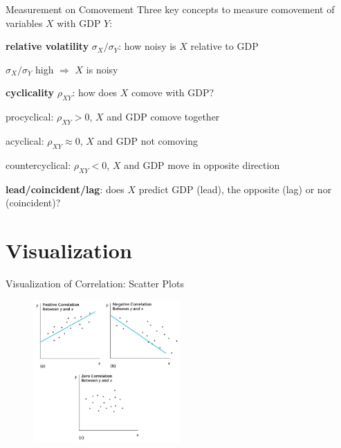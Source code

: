 \documentclass[11pt,aspectratio=169,usenames,dvipsnames]{beamer}
\let\tempone\itemize
\let\temptwo\enditemize
\renewenvironment{itemize}{\tempone\addtolength{\itemsep}{\fill}}{\temptwo}
\let\tempa\enumerate
\let\tempb\endenumerate
\renewenvironment{enumerate}{\tempa\addtolength{\itemsep}{\fill}}{\tempb}
\begin{document}
\begin{frame}{Measurement on Comovement}
\label{slide:Measurement_on_Comovement}
    Three key concepts to measure comovement of variables $ X $ with GDP $ Y $:
    \begin{enumerate}
        \item \textbf{relative volatility} $ \sigma_{X} / \sigma_{Y} $: how noisy is $ X $ relative to GDP
        \begin{itemize}
            \item $ \sigma_{X} / \sigma_{Y} $ high $ \Rightarrow  $ $ X $ is noisy
        \end{itemize}
        \item \textbf{cyclicality} $ \rho_{XY} $: how does $ X $ comove with GDP?
        \begin{enumerate}
            \item \alert{procyclical}: $ \rho_{XY} > 0 $, $ X $ and GDP comove \alert{together}
            \item \alert{acyclical}: $ \rho_{XY} \approx 0 $, $ X $ and GDP not comoving
            \item \alert{countercyclical}: $ \rho_{XY} < 0 $, $ X $ and GDP move in \alert{opposite} direction
        \end{enumerate}
        \item \textbf{lead/coincident/lag}: does $ X $ predict GDP (lead), the opposite (lag) or nor (coincident)?
    \end{enumerate}
\end{frame}

\section{Visualization}
\label{sec:Visualization}

\begin{frame}{Visualization of Correlation: Scatter Plots}
\label{slide:Visualization_of_Correlation__Scatter_Plots}
    \begin{figure}
        \includegraphics[width=0.5\textwidth]{./figures/Figure3_4.jpg}
    \end{figure}
\end{frame}
\end{document}
